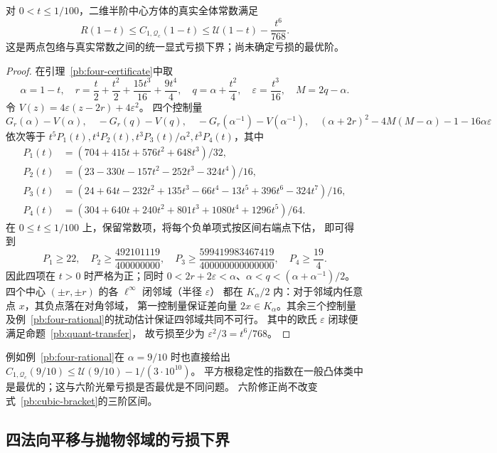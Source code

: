 \begin{theorem}[全体常数的显式六阶亏损]\label{pb:sixth-gap}
对 $0<t\le1/100$，二维半阶中心方体的真实全体常数满足
\[
 R(1-t)\le C_{1,\mathcal Q_c}(1-t)
 \le\mathcal U(1-t)-\frac{t^6}{768}.
\]
这是两点包络与真实常数之间的统一显式亏损下界；尚未确定亏损的最优阶。
\end{theorem}
\begin{proof}
在引理~\ref{pb:four-certificate}中取
\[
 \alpha=1-t,\quad r=\frac t2+\frac{t^2}2+\frac{15t^3}{16}+\frac{9t^4}4,
 \quad q=\alpha+\frac{t^2}4,\quad\varepsilon=\frac{t^3}{16},\quad M=2q-\alpha.
\]
令 $V(z)=4\varepsilon(z-2r)+4\varepsilon^2$。
四个控制量
\[
 G_r(\alpha)-V(\alpha),\quad-G_r(q)-V(q),\quad
 -G_r(\alpha^{-1})-V(\alpha^{-1}),\quad
 (\alpha+2r)^2-4M(M-\alpha)-1-16\alpha\varepsilon
\]
依次等于 $t^5P_1(t),t^4P_2(t),t^3P_3(t)/\alpha^2,t^3P_4(t)$，其中
\begin{align*}
 P_1(t)&=(704+415t+576t^2+648t^3)/32,\\
 P_2(t)&=(23-330t-157t^2-252t^3-324t^4)/16,\\
 P_3(t)&=(24+64t-232t^2+135t^3-66t^4-13t^5+396t^6-324t^7)/16,\\
 P_4(t)&=(304+640t+240t^2+801t^3+1080t^4+1296t^5)/64.
\end{align*}
在 $0\le t\le1/100$ 上，保留常数项，将每个负单项式按区间右端点下估，
即可得到
\[
 P_1\ge22,\quad P_2\ge\frac{492101119}{400000000},\quad
 P_3\ge\frac{599419983467419}{400000000000000},\quad P_4\ge\frac{19}4.
\]
因此四项在 $t>0$ 时严格为正；同时
$0<2r+2\varepsilon<\alpha$、$\alpha<q<(\alpha+\alpha^{-1})/2$。
四个中心 $(\pm r,\pm r)$ 的各 $\ell^\infty$ 闭邻域（半径 $\varepsilon$）
都在 $K_\alpha/2$ 内：对于邻域内任意点 $x$，其负点落在对角邻域，
第一控制量保证差向量 $2x\in K_\alpha$。其余三个控制量及例~\ref{pb:four-rational}的扰动估计保证四邻域共同不可行。
其中的欧氏 $\varepsilon$ 闭球便满足命题~\ref{pb:quant-transfer}，
故亏损至少为 $\varepsilon^2/3=t^6/768$。
\end{proof}

例如例~\ref{pb:four-rational}在 $\alpha=9/10$ 时也直接给出
$C_{1,\mathcal Q_c}(9/10)\le\mathcal U(9/10)-1/(3\cdot10^{10})$。
平方根稳定性的指数在一般凸体类中是最优的；这与六阶光晕亏损是否最优是不同问题。
六阶修正尚不改变式~\eqref{pb:cubic-bracket}的三阶区间。

\subsection{四法向平移与抛物邻域的亏损下界}


